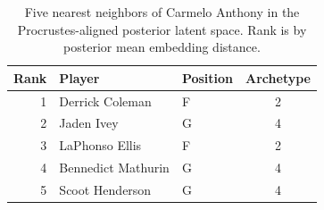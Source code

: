 \begin{table}[htbp]
  \centering\small
  \begin{tabular}{rllc}
    \toprule
    Rank & Player & Position & Archetype \\
    \midrule
    1 & Derrick Coleman & F & 2 \\
    2 & Jaden Ivey & G & 4 \\
    3 & LaPhonso Ellis & F & 2 \\
    4 & Bennedict Mathurin & G & 4 \\
    5 & Scoot Henderson & G & 4 \\
    \bottomrule
  \end{tabular}
  \caption{Five nearest neighbors of Carmelo Anthony in the Procrustes-aligned posterior latent space. Rank is by posterior mean embedding distance.}
  \label{tab:Carmelo_Anthony_neighbors}
\end{table}

